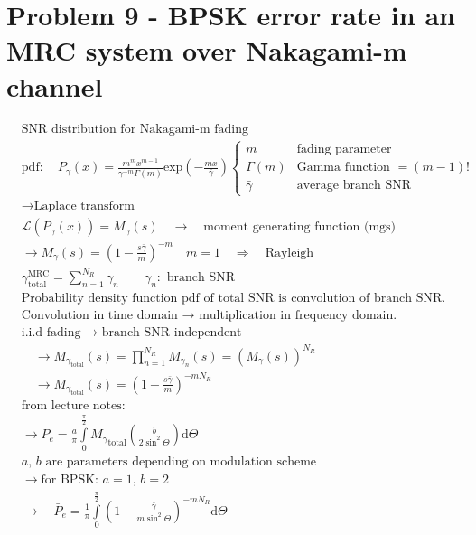 \section*{Problem 9 - BPSK error rate in an MRC system over Nakagami-m channel}
\begin{align*}
	& \text{SNR distribution for Nakagami-m fading}\\
	& \mathrm{pdf:}\quad P_\gamma\left(x\right)=\frac{m^mx^{m-1}}{\gamma^{-m}\Gamma\left(m\right)}\mathrm{exp}\left(-\frac{mx}{\bar{\gamma}}\right)
	\begin{cases}
		m & \text{fading parameter} \\
		\Gamma\left(m\right) & \text{Gamma function }=(m-1)! \\
		\bar{\gamma} & \text{average branch SNR}
	\end{cases} \\
	&\rightarrow\text{Laplace transform} \\
	&\mathcal{L}\left(P_\gamma\left(x\right)\right)=M_\gamma\left(s\right)\quad\rightarrow\quad\text{moment generating function (mgs)} \\
	&\rightarrow M_\gamma\left(s\right)=\left(1-\frac{s\bar{\gamma}}{m}\right)^{-m}\quad m=1\quad\Rightarrow\quad\text{Rayleigh} \\
	&\gamma_\mathrm{total}^\mathrm{MRC}=\sum\limits_{n=1}^{N_R}\gamma_n\qquad\gamma_n:\text{ branch SNR} \\
	&\text{Probability density function pdf of total SNR is convolution of branch SNR.} \\
	&\text{Convolution in time domain $\rightarrow$ multiplication in frequency domain.} \\
	&\text{i.i.d fading $\rightarrow$ branch SNR independent} \\
	&\quad\rightarrow M_{\gamma_\mathrm{total}}\left(s\right)=\prod\limits_{n=1}^{N_R}M_{\gamma_n}\left(s\right)=\left(M_\gamma\left(s\right)\right)^{N_R} \\
	&\quad\rightarrow M_{\gamma_\mathrm{total}}\left(s\right)=\left(1-\frac{s\bar{\gamma}}{m}\right)^{-mN_R} \\
	&\text{from lecture notes:} \\
	&\rightarrow \bar{P}_e=\frac{a}{\pi}\int\limits_0^{\frac{\pi}{2}}{M_\gamma}_\mathrm{total}\left(\frac{b}{2\sin^2\Theta}\right)\mathrm{d}\Theta \\
	&\text{$a$, $b$ are parameters depending on modulation scheme} \\
	&\rightarrow\text{for BPSK: $a=1$, $b=2$} \\
	&\rightarrow\quad\boxed{\bar{P}_e=\frac{1}{\pi}\int\limits_0^{\frac{\pi}{2}}\left(1-\frac{\bar{\gamma}}{m\sin^2\Theta}\right)^{-mN_R}\mathrm{d}\Theta}
\end{align*}
